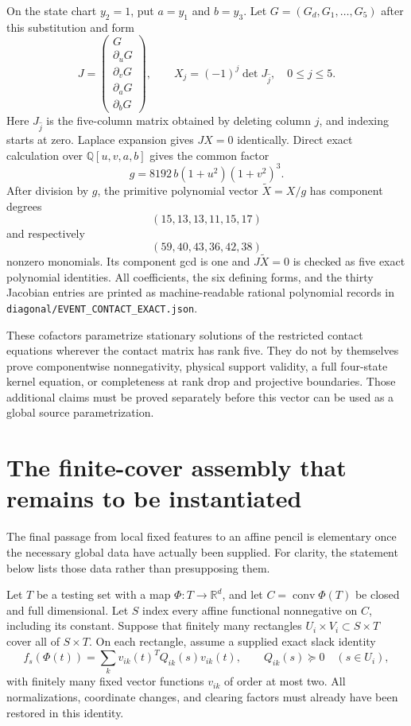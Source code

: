 On the state chart $y_2=1$, put $a=y_1$ and $b=y_3$. Let
$G=(G_d,G_1,\ldots,G_5)$ after this substitution and form
\[
 J=\begin{pmatrix}
 G\\ \partial_uG\\ \partial_vG\\ \partial_aG\\ \partial_bG
 \end{pmatrix},\qquad
 X_j=(-1)^j\det J_{\widehat j},\quad 0\le j\le5.
\]
Here $J_{\widehat j}$ is the five-column matrix obtained by deleting
column $j$, and indexing starts at zero. Laplace expansion gives
$JX=0$ identically. Direct exact calculation over
$\mathbb Q[u,v,a,b]$ gives the common factor
\[
 g=8192\,b(1+u^2)(1+v^2)^3.
\]
After division by $g$, the primitive polynomial vector
$\widetilde X=X/g$ has component degrees
\[
 (15,13,13,11,15,17)
\]
and respectively
\[
 (59,40,43,36,42,38)
\]
nonzero monomials. Its component gcd is one and
$J\widetilde X=0$ is checked as five exact polynomial identities.
All coefficients, the six defining forms, and the thirty Jacobian
entries are printed as machine-readable rational polynomial records
in \nolinkurl{diagonal/EVENT_CONTACT_EXACT.json}.

These cofactors parametrize stationary solutions of the restricted
contact equations wherever the contact matrix has rank five. They do
not by themselves prove componentwise nonnegativity, physical support
validity, a full four-state kernel equation, or completeness at rank
drop and projective boundaries. Those additional claims must be
proved separately before this vector can be used as a global source
parametrization.

\section{The finite-cover assembly that remains to be instantiated}
\label{sec:finite-cover-conditional}

The final passage from local fixed features to an affine pencil is
elementary once the necessary global data have actually been supplied.
For clarity, the statement below lists those data rather than
presupposing them.

Let $T$ be a testing set with a map $\Phi:T\to\mathbb R^d$, and let
$C=\operatorname{conv}\Phi(T)$ be closed and full dimensional. Let
$S$ index every affine functional nonnegative on $C$, including its
constant. Suppose that finitely many rectangles
$U_i\times V_i\subset S\times T$ cover all of $S\times T$. On each
rectangle, assume a supplied exact slack identity
\begin{equation}
 f_s(\Phi(t))=\sum_k v_{ik}(t)^TQ_{ik}(s)v_{ik}(t),\qquad
 Q_{ik}(s)\succeq0\quad(s\in U_i),
 \label{eq:finite-cover-local}
\end{equation}
with finitely many fixed vector functions $v_{ik}$ of order at most
two. All normalizations, coordinate changes, and clearing factors
must already have been restored in this identity.

